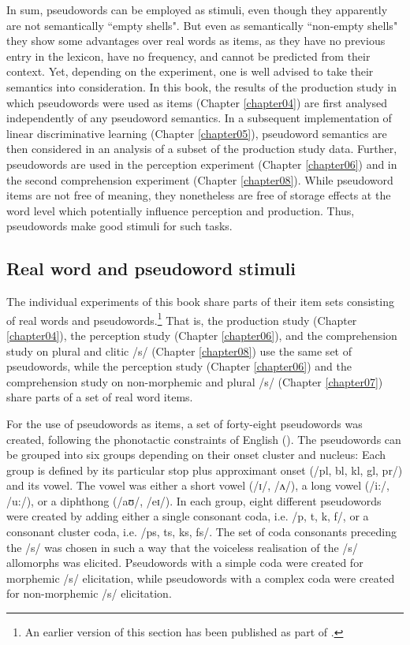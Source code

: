 In sum, pseudowords can be employed as stimuli, even though they apparently are not semantically ``empty shells". But even as semantically ``non-empty shells" they show some advantages over real words as items, as they have no previous entry in the lexicon, have no frequency, and cannot be predicted from their context. Yet, depending on the experiment, one is well advised to take their semantics into consideration. In this book, the results of the production study in which pseudowords were used as items (Chapter \ref{chapter04}) are first analysed independently of any pseudoword semantics. In a subsequent implementation of linear discriminative learning (Chapter \ref{chapter05}), pseudoword semantics are then considered in an analysis of a subset of the production study data. Further, pseudowords are used in the perception experiment (Chapter \ref{chapter06}) and in the second comprehension experiment (Chapter \ref{chapter08}). While pseudoword items are not free of meaning, they nonetheless are free of storage effects at the word level which potentially influence perception and production. Thus, pseudowords make good stimuli for such tasks.

\subsection{Real word and pseudoword stimuli}\label{section03_1_2}

The individual experiments of this book share parts of their item sets consisting of real words and pseudowords.\footnote{An earlier version of this section has been published as part of \citet{Schmitz2021a}.} That is, the production study (Chapter \ref{chapter04}), the perception study (Chapter \ref{chapter06}), and the comprehension study on plural and clitic /s/ (Chapter \ref{chapter08}) use the same set of pseudowords, while the perception study (Chapter \ref{chapter06}) and the comprehension study on non-morphemic and plural /s/ (Chapter \ref{chapter07}) share parts of a set of real word items.

For the use of pseudowords as items, a set of forty-eight pseudowords was created, following the phonotactic constraints of English (\cite{Gontijo2003}). The pseudowords can be grouped into six groups depending on their onset cluster and nucleus: Each group is defined by its particular stop plus approximant onset (/pl, bl, kl, gl, pr/) and its vowel. The vowel was either a short vowel (/ɪ/, /ʌ/), a long vowel (/i:/, /u:/), or a diphthong (/aʊ/, /eɪ/). In each group, eight different pseudowords were created by adding either a single consonant coda, i.e. /p, t, k, f/, or a consonant cluster coda, i.e. /ps, ts, ks, fs/. The set of coda consonants preceding the /s/ was chosen in such a way that the voiceless realisation of the /s/ allomorphs was elicited. Pseudowords with a simple coda were created for morphemic /s/ elicitation, while pseudowords with a complex coda were created for non-morphemic /s/ elicitation.

